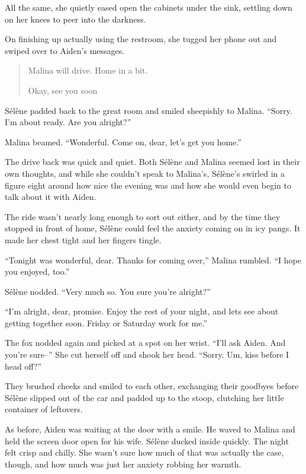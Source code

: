 All the same, she quietly eased open the cabinets under the sink, settling down on her knees to peer into the darkness.

On finishing up actually using the restroom, she tugged her phone out and swiped over to Aiden's messages.

\begin{quote}
 Malina will drive. Home in a bit.

 Okay, see you soon
\end{quote}

Sélène padded back to the great room and smiled sheepishly to Malina. ``Sorry. I'm about ready. Are you alright?''

Malina beamed. ``Wonderful. Come on, dear, let's get you home.''

\secdiv{}

\noindent The drive back was quick and quiet. Both Sélène and Malina seemed lost in their own thoughts, and while she couldn't speak to Malina's, Sélène's swirled in a figure eight around how nice the evening was and how she would even begin to talk about it with Aiden.

The ride wasn't nearly long enough to sort out either, and by the time they stopped in front of home, Sélène could feel the anxiety coming on in icy pangs. It made her chest tight and her fingers tingle.

``Tonight was wonderful, dear. Thanks for coming over,'' Malina rumbled. ``I hope you enjoyed, too.''

Sélène nodded. ``Very much so. You sure you're alright?''

``I'm alright, dear, promise. Enjoy the rest of your night, and lets see about getting together soon. Friday or Saturday work for me.''

The fox nodded again and picked at a spot on her wrist. ``I'll ask Aiden. And you're sure--'' She cut herself off and shook her head. ``Sorry. Um, kiss before I head off?''

They brushed cheeks and smiled to each other, exchanging their goodbyes before Sélène slipped out of the car and padded up to the stoop, clutching her little container of leftovers.

As before, Aiden was waiting at the door with a smile. He waved to Malina and held the screen door open for his wife. Sélène ducked inside quickly. The night felt crisp and chilly. She wasn't sure how much of that was actually the case, though, and how much was just her anxiety robbing her warmth.


